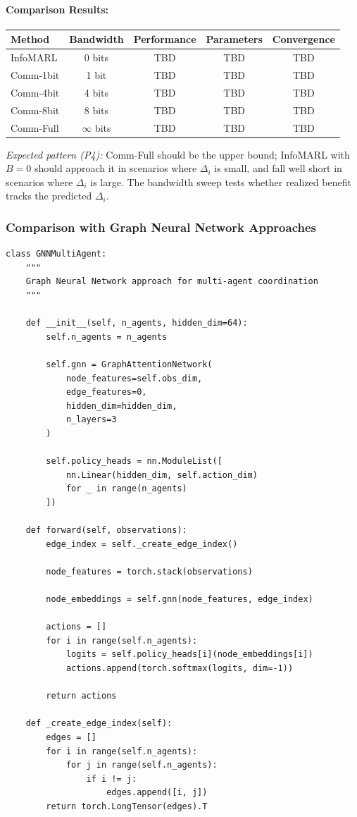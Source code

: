\documentclass[10pt, letterpaper]{article}
\begin{document}
\paragraph{Comparison Results:}

\begin{center}
\begin{tabular}{lcccc}
\toprule
\textbf{Method} & \textbf{Bandwidth} & \textbf{Performance} & \textbf{Parameters} & \textbf{Convergence} \\
\midrule
InfoMARL  & 0 bits        & TBD & TBD & TBD \\
Comm-1bit & 1 bit         & TBD & TBD & TBD \\
Comm-4bit & 4 bits        & TBD & TBD & TBD \\
Comm-8bit & 8 bits        & TBD & TBD & TBD \\
Comm-Full & $\infty$ bits & TBD & TBD & TBD \\
\bottomrule
\end{tabular}
\end{center}

\emph{Expected pattern (P4):} Comm-Full should be the upper bound; InfoMARL with $B=0$ should approach it in scenarios where $\Delta_i$ is small, and fall well short in scenarios where $\Delta_i$ is large. The bandwidth sweep tests whether realized benefit tracks the predicted $\Delta_i$.

\subsubsection{Comparison with Graph Neural Network Approaches}

\begin{lstlisting}
class GNNMultiAgent:
    """
    Graph Neural Network approach for multi-agent coordination
    """

    def __init__(self, n_agents, hidden_dim=64):
        self.n_agents = n_agents

        self.gnn = GraphAttentionNetwork(
            node_features=self.obs_dim,
            edge_features=0,
            hidden_dim=hidden_dim,
            n_layers=3
        )

        self.policy_heads = nn.ModuleList([
            nn.Linear(hidden_dim, self.action_dim)
            for _ in range(n_agents)
        ])

    def forward(self, observations):
        edge_index = self._create_edge_index()

        node_features = torch.stack(observations)

        node_embeddings = self.gnn(node_features, edge_index)

        actions = []
        for i in range(self.n_agents):
            logits = self.policy_heads[i](node_embeddings[i])
            actions.append(torch.softmax(logits, dim=-1))

        return actions

    def _create_edge_index(self):
        edges = []
        for i in range(self.n_agents):
            for j in range(self.n_agents):
                if i != j:
                    edges.append([i, j])
        return torch.LongTensor(edges).T
\end{lstlisting}
\end{document}
